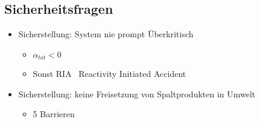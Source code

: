 \documentclass[12pt]{article}
\begin{document}
\subsection{Sicherheitsfragen}
\begin{itemize}
  \item Sicherstellung: System nie prompt Überkritisch 
  \begin{itemize}
    \item \(\alpha_{tot} < 0\)
    \item Sonst RIA \textrightarrow\ Reactivity Initiated Accident
  \end{itemize}
  \item Sicherstellung: keine Freisetzung von Spaltprodukten in Umwelt
  \begin{itemize}
    \item 5 Barrieren
  \end{itemize}
\end{itemize}
\end{document}
